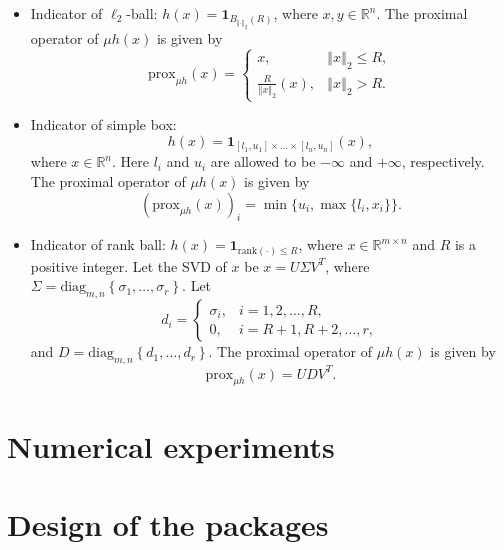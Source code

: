 \documentclass[a4paper]{article}
\newcommand{\norm}[1]{\left\Vert#1\right\Vert}
\newcommand{\mr}{\mathbb{R}}
\newcommand{\prox}{\mathrm{prox}}
\newcommand{\mi}{\mathbf{1}}
\newcommand{\diag}{\mathrm{diag}}
\newcommand{\rank}{\mathrm{rank}}
\begin{document}
\begin{itemize}
    \item {Indicator of $\ell_2$-ball:} $h(x) = 
    \mi_{ B_{\norm{\cdot}_2}(R)}$, where $x, y \in \mr^n$.
    The proximal operator of $\mu h(x)$ is given by
    \begin{displaymath}
      \prox_{\mu h}(x) = 
      \begin{cases}
        x, & \norm{x}_2 \le R, \\
        \frac{R}{\norm{x}_2}(x), & \norm{x}_2 > R.
      \end{cases}
    \end{displaymath}
    
    \item {Indicator of simple box:} $$h(x) = \mi_{[l_1,u_1] \times 
      \ldots \times [l_n,u_n]}(x),$$
    where $x \in \mr^n$. Here $l_i$ and $u_i$ are allowed to be 
    $-\infty$ and $+\infty$, respectively. The proximal operator of 
    $\mu h(x)$ is given by
    \begin{displaymath}
      (\prox_{\mu h}(x))_i = \min\{ u_i, \max\{l_i, x_i\} \}.
    \end{displaymath}
    
    \item {Indicator of rank ball:} $h(x) = \mi_{\rank(\cdot) \le 
      R}$, 
    where $x \in \mr^{m \times n}$ and $R$ is a positive integer. Let 
    the SVD of $x$ be $x = U \Sigma V^T$, where $\Sigma = 
    \diag_{m,n}\left\{ \sigma_1, \ldots, \sigma_r \right\}$. Let 
    \begin{displaymath}
      d_i = 
      \begin{cases}
        \sigma_i, & i = 1, 2, \ldots, R, \\
        0, & i = R+1, R+2, \ldots, r,
      \end{cases}
    \end{displaymath}
    and $D = \diag_{m,n}\left\{ d_1, \ldots, d_r \right\}$.
    The proximal operator of $\mu h(x)$ is given by
    \begin{displaymath}
      \prox_{\mu h}(x) = U D V^T.
    \end{displaymath}
    
  \end{itemize}
  
  
  
  
  
  
  \section{Numerical experiments}
  \label{sec:num}
  
  
  
  
  
  
  \appendix
  \renewcommand{\appendixname}{Appendix~\Alph{section}}
  
  
  \section{Design of the packages}
  \label{app:design}
  
\end{document}
